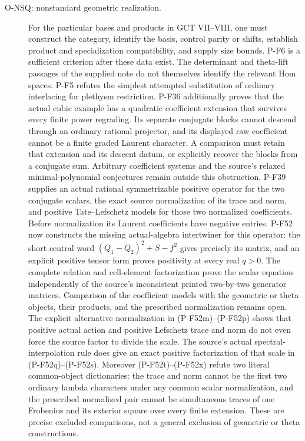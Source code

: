 \begin{description}
\item[O-NSQ: nonstandard geometric realization.]
For the particular bases and products in GCT VII--VIII, one must construct
the category, identify the basis, control parity or shifts, establish
product and specialization compatibility, and supply size bounds.
P-F6 is a sufficient criterion after these data exist. The determinant
and theta-lift passages of the supplied note do not themselves identify
the relevant Hom spaces. P-F5 refutes the simplest attempted substitution
of ordinary interlacing for plethysm restriction.
P-F36 additionally proves that the actual cubic example has a
quadratic coefficient extension that survives every finite power
regrading. Its separate conjugate blocks cannot descend through
an ordinary rational projector, and its displayed raw coefficient
cannot be a finite graded Laurent character. A comparison must
retain that extension and its descent datum, or explicitly recover
the blocks from a conjugate sum. Arbitrary coefficient systems
and the source's relaxed minimal-polynomial conjectures remain
outside this obstruction.
P-F39 supplies an actual rational symmetrizable positive operator
for the two conjugate scalars, the exact source normalization of
its trace and norm, and positive Tate--Lefschetz models for those
two normalized coefficients. Before normalization its Laurent
coefficients have negative entries. P-F52 now constructs the
missing actual-algebra intertwiner for this operator: the short
central word $(Q_1-Q_2)^2+S-f^2$ gives precisely its matrix,
and an explicit positive tensor form proves positivity at every
real $q>0$. The complete relation and cell-element factorization
prove the scalar equation independently of the source's
inconsistent printed two-by-two generator matrices. Comparison
of the coefficient models with the geometric or theta objects,
their products, and the prescribed normalization remains open.
The explicit alternative normalization in (P-F52m)--(P-F52p)
shows that positive actual action and positive Lefschetz trace
and norm do not even force the source factor to divide the scale.
The source's actual spectral-interpolation rule does give an
exact positive factorization of that scale in (P-F52q)--(P-F52s).
Moreover (P-F52t)--(P-F52x) refute two literal common-object
dictionaries: the trace and norm cannot be the first two ordinary
lambda characters under any common scalar normalization, and
the prescribed normalized pair cannot be simultaneous traces of
one Frobenius and its exterior square over every finite extension.
These are precise excluded comparisons, not a general exclusion
of geometric or theta constructions.


\end{description}
